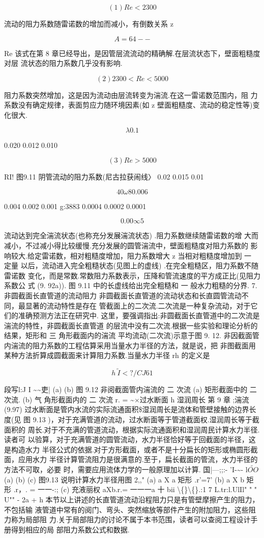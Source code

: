 \[(1) Re<2300\]

流动的阻力系数随雷诺数的增加而减小，有倒数关系 z

\[A = 64 --\]

Re 该式在第 8 章已经导出，是因管层流流动的精确解.在层流状态下，壁面粗糙度对层 流状态的阻力系数几乎没有影响.

\[(2) 2300<Re<5000\]

阻力系数突然增加，这是因为流动由层流转变为湍流.在这一雷诺数范围内，阻 力系数没有确定规律，表面剪应力随环境因素(如 z 壁面粗糙度、流动的稳定性等)变 化很大.

\[\lambda 0.1\]

0.020 0.012 0.010

\[(3) Re>5000\]

RI! 图9.11 阴管流动的阻力系数(尼古拉获闹线〉 0.02 0.015 0.01

\[40\omega 8 0.006\]

0.004 0.002 0.001 g:3883 0.0004 0.0002 0.0001

\[0.00\infty 5\]

流动达到完全湍流状态(也称充分发展湍流状态) .阻力系数继续随雷诺数的增 大而减小，不过减小得比较缓慢.充分发展的圆管湍流中，壁面粗糙度对阻力系数的 影响较大.给定雷诺数，相对粗糙度增加，阻力系数增大 z 当相对粗糙度增加到 一 定量 以后，流动进入完全粗糙状态(见图上的虚线) .在完全粗糙区，阻力系数不随雷诺数 变化，而是常数.常数阻力系数表示，压降和管流速度的平方成正比(见阻力系数公 式 (9. 92a)). 图 9.11 中的长虚线给出完全粗糙和 一 般水力粗糙的分界. 7. 非圆截面长直管道的流动阻力 非圆截面长直管道的流动状态和长直圆管流动不同，最显著的流动特性是存在 管截面上的二次流.二次流是一种复杂流动，对于它们的准确预测方法正在研究中. 这里，要强调指出:非圆截面长直管道中的二次流是湍流的特性，非圆截面长直管道 的层流中没有二次流.根据一些实验和理论分析的结果，矩形和 三 角形截面内的湍流 平均流动(二次流)示意于图 9. 12. 非因截面管内湍流的阻力系数的工程估算采用当量水力半径的方法，就是说，把 非图截面用某种方法折算成圆截面来计算阻力系数.当量水力半径 rh 的定义是

\[h~\tilde{I} <?/CJ61\]

段写l:J I \textasciitilde{}\textasciitilde{}吏| (a) (b) 图 9.12 非阅截面管内湍流的 二 次流 (a) 矩形截面中的 二 次流. (b) 气 角形截面内的 二 次流 r. = \textasciitilde{}$\times $过水断面 h 湿润周长 第 9 章 ;湍流 (9.97) 过水断面是管内水流的实际流通面积\$湿润周长是流体和管壁接触的边界长度(见 图 9.13 )，对于充满管道的流动，过水断面等于管道截面权.湿润周长等于截面积的 周长.对于不充满的管道流动，根据实际流通面积和湿润周民计算水力半径.读者可 以验算，对于充满管道的圆管流动，水力半径恰好等于回截面的半径，这是构造水力 半径公式的依据.对于方形截面，或者不是十分扁长的矩形或椭圆形截面，应用水力 半径计算管流阻力是很满意的.至于，扁长截面的管流，水力半径的方法不可取，必要 时，需要应用流体力学的一般原理加以计算. 国|---;;:- 'I-\textasciitilde{}- l$\tilde{OO}$ (a) (b) (c) 图9.13 说明计算水力半径用图 2,," (a) a X a 矩形 .r'=7' (b) a X b 矩形 .r，. = 一一-:; (c) 充液丽权 aXb.r.= 一一一a 十 bii \textbackslash\{\}\textbackslash\{\}.:1 7 L.tr:l.UlIl" " " U"" - 2a + h 本节以上讲述的长直管道流动沿程阻力只是有管壁摩擦产生的阻力，不包括输 液管道中常有的阅门、弯头、突然缩放等部件产生的附加阻力，这些阻力称为局部阻 力.关于局部阻力的讨论不属于本书范围，读者可以查阅工程设计手册得到相应的局 部阻力系数公式和数据.

